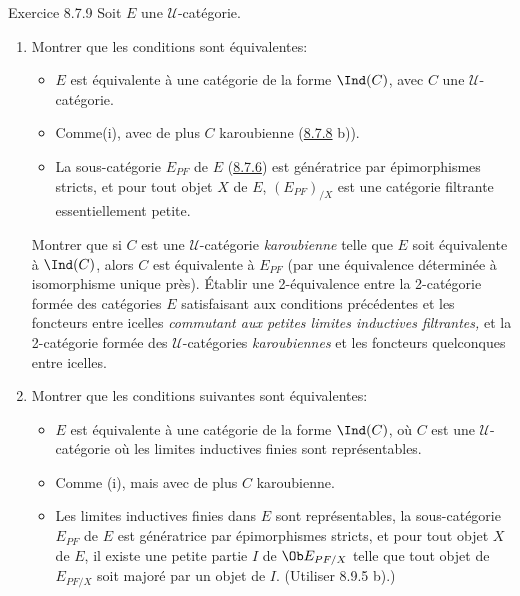 \begin{enonce*}[remark]{Exercice 8.7.9}
Soit $E$ une $𝒰$-catégorie.
\begin{enumerate}
\renewcommand{\theenumi}{\alph{enumi}}
\renewcommand{\labelenumi}{\theenumi)}
\item Montrer que les conditions sont équivalentes:

\begin{itemize}
\item[(i)] $E$ est équivalente à une catégorie de la forme
$\Ind(C)$, avec $C$ une $𝒰$-catégorie.

\item[(i bis)] Comme\pageoriginale (i), avec de plus $C$ karoubienne
(\hyperref[I.exer8.7.8]{8.7.8} b)).

\item[(ii)] La sous-catégorie $E_{PF}$ de $E$ (\hyperref[I.cor8.7.6]{8.7.6}) est
génératrice par épimorphismes stricts, et pour tout objet $X$ de
$E$, $(E_{PF})_{/X}$ est une catégorie filtrante essentiellement
petite.
\end{itemize}

Montrer que si $C$ est une $𝒰$-catégorie \emph{karoubienne}
telle que $E$ soit équivalente à $\Ind(C)$, alors $C$ est
équivalente à $E_{PF}$ (par une équivalence déterminée à
isomorphisme unique près). Établir une 2-équivalence entre la
2-catégorie formée des catégories $E$ satisfaisant aux conditions
précédentes et les foncteurs entre icelles \emph{commutant aux
petites limites inductives filtrantes,} et la 2-catégorie formée des
$𝒰$-catégories \emph{karoubiennes} et les foncteurs
quelconques entre icelles.

\item Montrer que les conditions suivantes sont équivalentes:

\begin{itemize}
\item[(i)] $E$ est équivalente à une catégorie de la forme
$\Ind(C)$, où $C$ est une $𝒰$-catégorie où les limites
inductives finies sont représentables.

\item[(i bis)] Comme (i), mais avec de plus $C$ karoubienne.

\item[(ii)] Les limites inductives finies dans $E$ sont
représentables, la sous-catégorie $E_{PF}$ de $E$ est génératrice
par épimorphismes stricts, et pour tout objet $X$ de $E$, il existe
une petite partie $I$ de $\Ob E_{PF/X}$ telle que tout objet de
$E_{PF/X}$ soit majoré par un objet de $I$. (Utiliser 8.9.5 b).)
\end{itemize}
\end{enumerate}
\end{enonce*}

